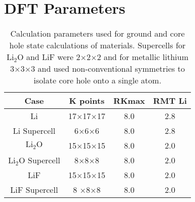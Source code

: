 \section{DFT Parameters}
\begin{table}[H]
	\centering
	\caption{Calculation parameters used for ground and core hole state calculations of materials. Supercells for $ \mathrm{Li_2O} $ and LiF were 2$\times$2$\times$2 and for metallic lithium 3$\times$3$\times$3  and used non-conventional symmetries to isolate core hole onto a single atom. }
	\begin{tabular}{cccc}
		Case	& K points	& RKmax	& RMT Li				\\
		\hline
		Li	&17$\times$17$\times$17	&8.0	&2.8	\\
		Li Supercell	&6$\times$6$\times$6	&8.0	&2.8	\\
		$\mathrm{Li_2O}$	&15$\times$15$\times$15	&8.0	&2.0	\\
		$\mathrm{Li_2O}$ Supercell	& 8$\times$8$\times$8	&8.0	&2.0	\\
		LiF	&15$\times$15$\times$15&8.0	&2.0	\\
		LiF Supercell	&8 $\times$8$\times$8	&8.0	&2.0\\
	\end{tabular} 
	\label{calc_params}
\end{table}

